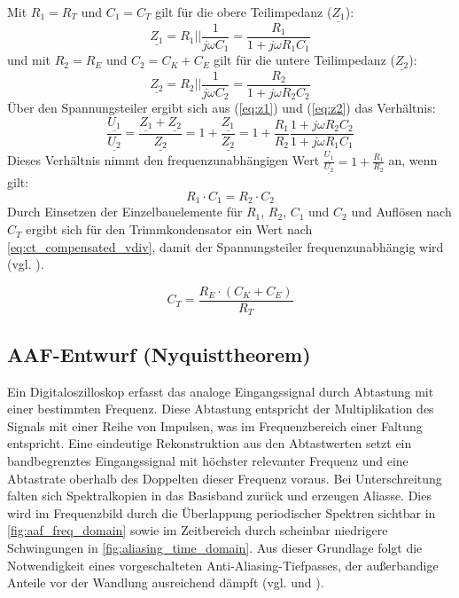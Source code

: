 \documentclass[a4paper, portrait, 12pt]{scrartcl} %
\begin{document}
Mit $R_1=R_T$ und $C_1=C_T$ gilt für die obere Teilimpedanz ($\underline{Z_1}$):
\begin{equation}
	\underline{Z_1}=R_1||\frac{1}{j\omega C_1}=\frac{R_1}{1+j\omega R_1 C_1}
	\label{eq:z1}
\end{equation}
und mit $R_2=R_E$ und $C_2=C_K+C_E$ gilt für die untere Teilimpedanz ($\underline{Z_2}$):
\begin{equation}
	\underline{Z_2}=R_2||\frac{1}{j\omega C_2}=\frac{R_2}{1+j\omega R_2 C_2}
	\label{eq:z2}
\end{equation}
Über den Spannungsteiler ergibt sich aus (\ref{eq:z1}) und (\ref{eq:z2}) das Verhältnis:
\begin{equation}
	\frac{\underline{U_1}}{\underline{U_2}}=\frac{\underline{Z_1}+\underline{Z_2}}{\underline{Z_2}}=1+\frac{\underline{Z_1}}{\underline{Z_2}}=1+\frac{R_1}{R_2}\frac{1+j\omega R_2 C_2}{1+j\omega R_1 C_1}
	\label{eq:comp_vdiv}
\end{equation}
Dieses Verhältnis nimmt den frequenzunabhängigen Wert $\frac{\underline{U_1}}{\underline{U_2}}=1+\frac{R_1}{R_2}$ an, wenn gilt:
\begin{equation}
	R_1\cdot C_1=R_2\cdot C_2
\end{equation}
Durch Einsetzen der Einzelbauelemente für $R_1$, $R_2$, $C_1$ und $C_2$ und Auflösen nach $C_T$ ergibt sich für den Trimmkondensator ein Wert nach \autoref{eq:ct_compensated_vdiv}, damit der Spannungsteiler frequenzunabhängig wird (vgl. \cite[S. 104-106]{Schruefer2022}).

\begin{equation}
	C_T=\frac{R_E\cdot (C_K+C_E)}{R_T}
	\label{eq:ct_compensated_vdiv}
\end{equation}

\subsection{AAF-Entwurf (Nyquisttheorem)}
\label{subsec:aaf_nyquist}

Ein Digitaloszilloskop erfasst das analoge Eingangssignal durch Abtastung mit einer bestimmten Frequenz. Diese Abtastung entspricht der Multiplikation des Signals mit einer Reihe von Impulsen, was im Frequenzbereich einer Faltung entspricht. Eine eindeutige Rekonstruktion aus den Abtastwerten setzt ein bandbegrenztes Eingangssignal mit höchster relevanter Frequenz und eine Abtastrate oberhalb des Doppelten dieser Frequenz voraus. Bei Unterschreitung falten sich Spektralkopien in das Basisband zurück und erzeugen Aliasse. Dies wird im Frequenzbild durch die Überlappung periodischer Spektren sichtbar in \autoref{fig:aaf_freq_domain} sowie im Zeitbereich durch scheinbar niedrigere Schwingungen in \autoref{fig:aliasing_time_domain}. Aus dieser Grundlage folgt die Notwendigkeit eines vorgeschalteten Anti-Aliasing-Tiefpasses, der außerbandige Anteile vor der Wandlung ausreichend dämpft (vgl. \cite[S. 314-316]{Bernstein2023} und \cite[S. 151-156]{Bernstein2024}).
\end{document}
